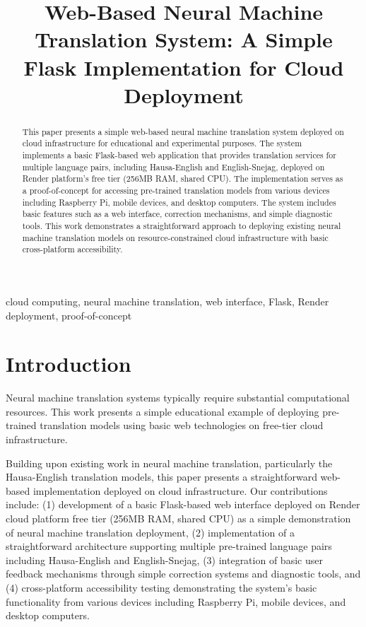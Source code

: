 \documentclass[conference]{IEEEtran}
\begin{document}
\title{Web-Based Neural Machine Translation System: A Simple Flask Implementation for Cloud Deployment}

\author{
}

\maketitle

\begin{abstract}
This paper presents a simple web-based neural machine translation system deployed on cloud infrastructure for educational and experimental purposes. The system implements a basic Flask-based web application that provides translation services for multiple language pairs, including Hausa-English and English-Snejag, deployed on Render platform's free tier (256MB RAM, shared CPU). The implementation serves as a proof-of-concept for accessing pre-trained translation models from various devices including Raspberry Pi, mobile devices, and desktop computers. The system includes basic features such as a web interface, correction mechanisms, and simple diagnostic tools. This work demonstrates a straightforward approach to deploying existing neural machine translation models on resource-constrained cloud infrastructure with basic cross-platform accessibility.
\end{abstract}

\begin{IEEEkeywords}
cloud computing, neural machine translation, web interface, Flask, Render deployment, proof-of-concept
\end{IEEEkeywords}

\section{Introduction}

Neural machine translation systems typically require substantial computational resources. This work presents a simple educational example of deploying pre-trained translation models using basic web technologies on free-tier cloud infrastructure.

Building upon existing work in neural machine translation, particularly the Hausa-English translation models, this paper presents a straightforward web-based implementation deployed on cloud infrastructure. Our contributions include: (1) development of a basic Flask-based web interface deployed on Render cloud platform free tier (256MB RAM, shared CPU) as a simple demonstration of neural machine translation deployment, (2) implementation of a straightforward architecture supporting multiple pre-trained language pairs including Hausa-English and English-Snejag, (3) integration of basic user feedback mechanisms through simple correction systems and diagnostic tools, and (4) cross-platform accessibility testing demonstrating the system's basic functionality from various devices including Raspberry Pi, mobile devices, and desktop computers.
\end{document}
